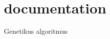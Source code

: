 \chapter{documentation}
\hypertarget{md__c_1_2_dev_2_dungeon_generator_2_dungeon_generator_2documentation}{}\label{md__c_1_2_dev_2_dungeon_generator_2_dungeon_generator_2documentation}
Genetikus algoritmus 